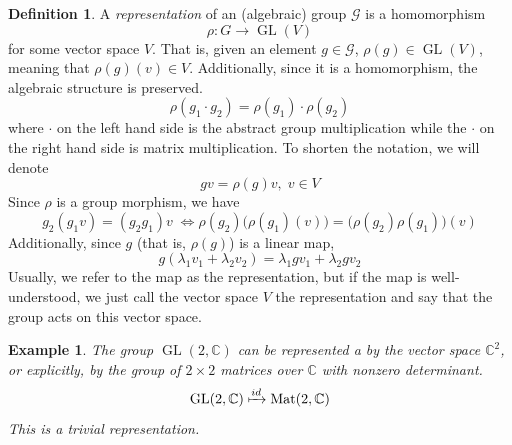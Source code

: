 \documentclass{article}
\DeclareMathOperator{\GL}{GL}
\newtheorem{example}{Example}[section]
\theoremstyle{remark}
\theoremstyle{definition}
\newtheorem{definition}{Definition}[section]
\begin{document}
\begin{definition}
A \textit{representation} of an (algebraic) group $\mathcal{G}$ is a homomorphism 
\[\rho: G \longrightarrow \GL(V)\]
for some vector space $V$. That is, given an element $g \in \mathcal{G}$, $\rho(g) \in \GL (V)$, meaning that $\rho(g)(v) \in V$. Additionally, since it is a homomorphism, the algebraic structure is preserved. 
\[\rho(g_1 \cdot g_2) = \rho(g_1) \cdot \rho(g_2)\]
where $\cdot$ on the left hand side is the abstract group multiplication while the $\cdot$ on the right hand side is matrix multiplication. To shorten the notation, we will denote 
\[g v = \rho(g) v, \; v \in V\]
Since $\rho$ is a group morphism, we have 
\[g_2 (g_1 v) = (g_2 g_1) v \; \iff \rho(g_2) \big( \rho(g_1) (v) \big) = \big( \rho(g_2) \rho(g_1) \big) (v)\]
Additionally, since $g$ (that is, $\rho(g)$) is a linear map, 
\[g(\lambda_1 v_1 + \lambda_2 v_2) = \lambda_1 g v_1 + \lambda_2 g v_2\]
Usually, we refer to the map as the representation, but if the map is well-understood, we just call the vector space $V$ the representation and say that the group acts on this vector space. 
\end{definition}

\begin{example}
The group $\GL(2, \mathbb{C})$ can be represented a by the vector space $\mathbb{C}^2$, or explicitly, by the group of $2 \times 2$ matrices over $\mathbb{C}$ with nonzero determinant.
\[\GL(2, \mathbb{C}) \xmapsto{id} \text{Mat}(2, \mathbb{C})\]
This is a trivial representation. 
\end{example}
\end{document}
